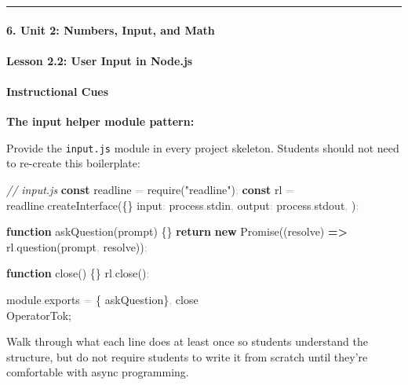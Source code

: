 \documentclass[
  justified,
  openright,
]{tufte-book}
\let\subsection\paragraph
\let\paragraph\paragraph
\newcommand{\KeywordTok}[1]{\textcolor{CodeKeyword}{\textbf{#1}}}  %
\newcommand{\StringTok}[1]{\textcolor{CodeString}{#1}}              %
\newcommand{\CommentTok}[1]{\textcolor{CodeComment}{\textit{#1}}}  %
\newcommand{\CodeFuncTok}[1]{\textcolor{CodeKeyword}{#1}}           %
\newcommand{\CodeTypeTok}[1]{\textcolor{CodeType}{#1}}              %
\newcommand{\CodeAccentTok}[1]{\textcolor{CodeAccent}{#1}}          %
\newcommand{\OperatorTok}[1]{\textcolor{DarkGray}{#1}}              %
\newenvironment{Shaded}{%
  \begin{mdframed}[style=TufteCode]%
}{%
  \end{mdframed}%
}
\let\subsection\paragraph
\let\paragraph\paragraph
\begin{document}
\begin{center}\rule{0.5\linewidth}{0.5pt}\end{center}

\subsection{6. Unit 2: Numbers, Input, and
Math}\label{unit-2-numbers-input-and-math}

\subsection{Lesson 2.2: User Input in
Node.js}\label{lesson-2.2-user-input-in-node.js}

\paragraph{Instructional Cues}\label{instructional-cues-13}

\textbf{The input helper module pattern:}

Provide the \texttt{input.js} module in every project skeleton. Students
should not need to re-create this boilerplate:

\begin{Shaded}
\begin{Highlighting}[]
\CommentTok{// input.js}
\KeywordTok{const} readline \OperatorTok{=} \CodeAccentTok{require}(\StringTok{"readline"})\OperatorTok{;}
\KeywordTok{const} rl \OperatorTok{=} readline\OperatorTok{.}\CodeFuncTok{createInterface}(\{\}
  \CodeTypeTok{input}\OperatorTok{:} process\OperatorTok{.}\CodeTypeTok{stdin}\OperatorTok{,}
  \CodeTypeTok{output}\OperatorTok{:} process\OperatorTok{.}\CodeTypeTok{stdout}\OperatorTok{,}
)\OperatorTok{;}
 
\KeywordTok{function} \CodeFuncTok{askQuestion}(prompt) \{\}
  \KeywordTok{return} \KeywordTok{new} Promise((resolve) \KeywordTok{=\textgreater{}} rl\OperatorTok{.}\CodeFuncTok{question}(prompt\OperatorTok{,} resolve))\OperatorTok{;}
\
 
\KeywordTok{function} \CodeFuncTok{close}() \{\}
  rl\OperatorTok{.}\CodeFuncTok{close}()\OperatorTok{;}
\
 
module\OperatorTok{.}\CodeTypeTok{exports} \OperatorTok{=} \{ askQuestion\}\OperatorTok{,} close \\OperatorTok{;}
\end{Highlighting}
\end{Shaded}

Walk through what each line does at least once so students understand
the structure, but do not require students to write it from scratch
until they're comfortable with async programming.
\end{document}
